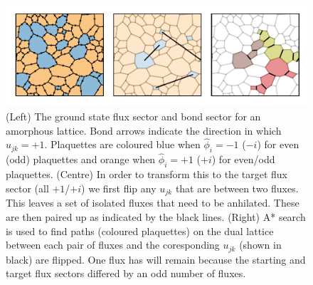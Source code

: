 \begin{figure}
\hypertarget{fig:flux_finding}{%
\centering
\includegraphics{figure_code/amk_chapter/flux_finding/flux_finding.pdf}
\caption{(Left) The ground state flux sector and bond sector for an
amorphous lattice. Bond arrows indicate the direction in which
\(u_{jk} = +1\). Plaquettes are coloured blue when \(\hat{\phi}_i = -1\)
(\(-i\)) for even (odd) plaquettes and orange when \(\hat{\phi}_i = +1\)
(\(+i\)) for even/odd plaquettes. (Centre) In order to transform this to
the target flux sector (all \(+1\)/\(+i\)) we first flip any \(u_{jk}\)
that are between two fluxes. This leaves a set of isolated fluxes that
need to be anhilated. These are then paired up as indicated by the black
lines. (Right) A* search is used to find paths (coloured plaquettes) on
the dual lattice between each pair of fluxes and the coresponding
\(u_{jk}\) (shown in black) are flipped. One flux has will remain
because the starting and target flux sectors differed by an odd number
of fluxes.}\label{fig:flux_finding}
}
\end{figure}
